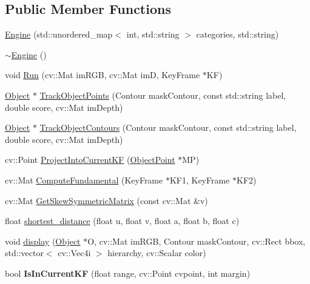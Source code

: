 \subsection*{Public Member Functions}
\begin{DoxyCompactItemize}
\item 
\hyperlink{classEngine_ab3818182cd3d2b3a788ac04d743cf6f4}{Engine} (std\+::unordered\+\_\+map$<$ int, std\+::string $>$ categories, std\+::string)
\item 
\hyperlink{classEngine_a8ef7030a089ecb30bbfcb9e43094717a}{$\sim$\+Engine} ()
\item 
void \hyperlink{classEngine_a0e1fdb5ff8c992b1795eff03e2551708}{Run} (cv\+::\+Mat im\+R\+GB, cv\+::\+Mat imD, Key\+Frame $\ast$KF)
\item 
\hyperlink{classObject}{Object} $\ast$ \hyperlink{classEngine_ad6d6151754fc9b77c75ce041f4653007}{Track\+Object\+Points} (Contour mask\+Contour, const std\+::string label, double score, cv\+::\+Mat im\+Depth)
\item 
\hyperlink{classObject}{Object} $\ast$ \hyperlink{classEngine_a76d6ccc8e7dd30849fbcb039cd8cf5a6}{Track\+Object\+Contours} (Contour mask\+Contour, const std\+::string label, double score, cv\+::\+Mat im\+Depth)
\item 
cv\+::\+Point \hyperlink{classEngine_ab7feb6f45507d808379e9c4ba6cae90b}{Project\+Into\+Current\+KF} (\hyperlink{classObjectPoint}{Object\+Point} $\ast$MP)
\item 
cv\+::\+Mat \hyperlink{classEngine_a381792d9c8cf59c365aa9ef5ff1841fb}{Compute\+Fundamental} (Key\+Frame $\ast$K\+F1, Key\+Frame $\ast$K\+F2)
\item 
cv\+::\+Mat \hyperlink{classEngine_ade7b2b448a71642155d74932139c26d7}{Get\+Skew\+Symmetric\+Matrix} (const cv\+::\+Mat \&v)
\item 
float \hyperlink{classEngine_a21c2286837892a045674c6e9c2aaa0b8}{shortest\+\_\+distance} (float u, float v, float a, float b, float c)
\item 
void \hyperlink{classEngine_a45c5502ceecdd852f9417ed0d7c73648}{display} (\hyperlink{classObject}{Object} $\ast$O, cv\+::\+Mat im\+R\+GB, Contour mask\+Contour, cv\+::\+Rect bbox, std\+::vector$<$ cv\+::\+Vec4i $>$ hierarchy, cv\+::\+Scalar color)
\item 
\mbox{\label{classEngine_adbb2bcd0cf0e2f084226f38477a871a9}} 
bool {\bfseries Is\+In\+Current\+KF} (float range, cv\+::\+Point cvpoint, int margin)
\end{DoxyCompactItemize}
